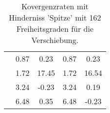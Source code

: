 \begin{table}
\begin{tabular}{c|cc|cc|}
\multicolumn{1}{|c|}{} & \multicolumn{1}{|c|}{      0.87} & \multicolumn{1}{|c|}{      0.23} & \multicolumn{1}{|c|}{      0.87} & \multicolumn{1}{|c|}{      0.23} \\ 
\multicolumn{1}{|c|}{} & \multicolumn{1}{|c|}{      1.72} & \multicolumn{1}{|c|}{     17.45} & \multicolumn{1}{|c|}{      1.72} & \multicolumn{1}{|c|}{     16.54} \\ 
\multicolumn{1}{|c|}{} & \multicolumn{1}{|c|}{      3.24} & \multicolumn{1}{|c|}{     -0.23} & \multicolumn{1}{|c|}{      3.24} & \multicolumn{1}{|c|}{      0.19} \\ 
\multicolumn{1}{|c|}{} & \multicolumn{1}{|c|}{      6.48} & \multicolumn{1}{|c|}{      0.35} & \multicolumn{1}{|c|}{      6.48} & \multicolumn{1}{|c|}{     -0.23} \\ 
\hline 
\end{tabular}\caption{Kovergenzraten mit Hinderniss 'Spitze' mit 162 Freiheitsgraden für die Verschiebung.}\label{tab:Rate_Spitze_level2}
\end{table} 
